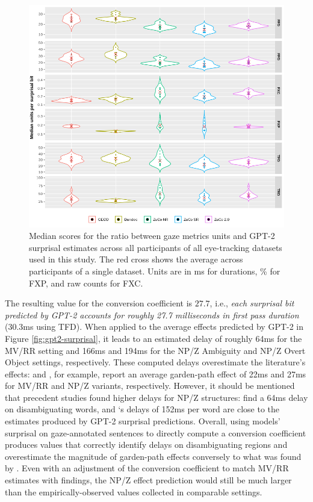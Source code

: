 \documentclass[a4paper, nobind]{templates/ociamthesis}
\begin{document}
\begin{figure}

{\centering \includegraphics[width=1\linewidth]{figures/5_surprisal_ratios} 

}

\caption{Median scores for the ratio between gaze metrics units and GPT-2 surprisal estimates across all participants of all eye-tracking datasets used in this study. The red cross shows the average across participants of a single dataset. Units are in ms for durations, \% for FXP, and raw counts for FXC.}\label{fig:surprisal-ratios}
\end{figure}

The resulting value for the conversion coefficient is \(27.7\), i.e., \emph{each surprisal bit predicted by GPT-2 accounts for roughly 27.7 milliseconds in first pass duration} (30.3ms using TFD). When applied to the average effects predicted by GPT-2 in Figure \ref{fig:gpt2-surprisal}, it leads to an estimated delay of roughly 64ms for the MV/RR setting and 166ms and 194ms for the NP/Z Ambiguity and NP/Z Overt Object settings, respectively. These computed delays overestimate the literature's effects: \textcite{prasad-linzen-2019-self} and \textcite{prasad-linzen-2019-much}, for example, report an average garden-path effect of 22ms and 27ms for MV/RR and NP/Z variants, respectively. However, it should be mentioned that precedent studies found higher delays for NP/Z structures: \textcite{grodner-etal-2003-against} find a 64ms delay on disambiguating words, and \textcite{sturt-etal-1999-structural}`s delays of 152ms per word are close to the estimates produced by GPT-2 surprisal predictions. Overall, using models' surprisal on gaze-annotated sentences to directly compute a conversion coefficient produces values that correctly identify delays on disambiguating regions and overestimate the magnitude of garden-path effects conversely to what was found by \textcite{schjindel-linzen-2020-single}. Even with an adjustment of the conversion coefficient to match MV/RR estimates with \textcite{prasad-linzen-2019-self} findings, the NP/Z effect prediction would still be much larger than the empirically-observed values collected in comparable settings.
\end{document}
